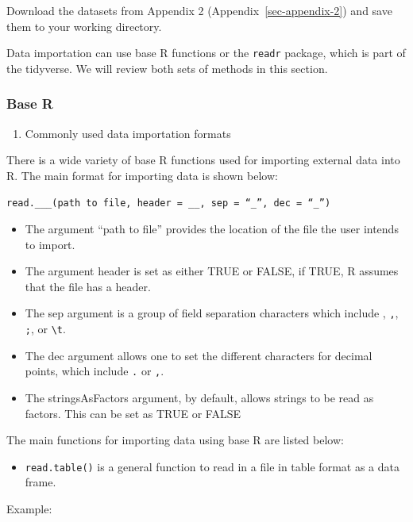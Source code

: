\documentclass[
  letterpaper,
  DIV=11,
  numbers=noendperiod]{scrreprt}
\providecommand{\tightlist}{%
  \setlength{\itemsep}{0pt}\setlength{\parskip}{0pt}}\usepackage{longtable,booktabs,array}
\begin{document}
Download the datasets from Appendix 2 (Appendix~\ref{sec-appendix-2})
and save them to your working directory.

Data importation can use base R functions or the \texttt{readr} package,
which is part of the tidyverse. We will review both sets of methods in
this section.

\subsubsection{Base R}\label{base-r}

\begin{enumerate}
\def\labelenumi{\arabic{enumi}.}
\tightlist
\item
  Commonly used data importation formats
\end{enumerate}

There is a wide variety of base R functions used for importing external
data into R. The main format for importing data is shown below:

\texttt{read.\_\_\_(path\ to\ file,\ header\ =\ \_\_,\ sep\ =\ “\_”,\ dec\ =\ “\_”)}

\begin{itemize}
\item
  The argument ``path to file'' provides the location of the file the
  user intends to import.
\item
  The argument header is set as either TRUE or FALSE, if TRUE, R assumes
  that the file has a header.
\item
  The sep argument is a group of field separation characters which
  include , \texttt{,}, \texttt{;}, or \texttt{\textbackslash{}t}.
\item
  The dec argument allows one to set the different characters for
  decimal points, which include \texttt{.} or \texttt{,}.
\item
  The stringsAsFactors argument, by default, allows strings to be read
  as factors. This can be set as TRUE or FALSE
\end{itemize}

The main functions for importing data using base R are listed below:

\begin{itemize}
\tightlist
\item
  \texttt{read.table()} is a general function to read in a file in table
  format as a data frame.
\end{itemize}

Example:
\end{document}
